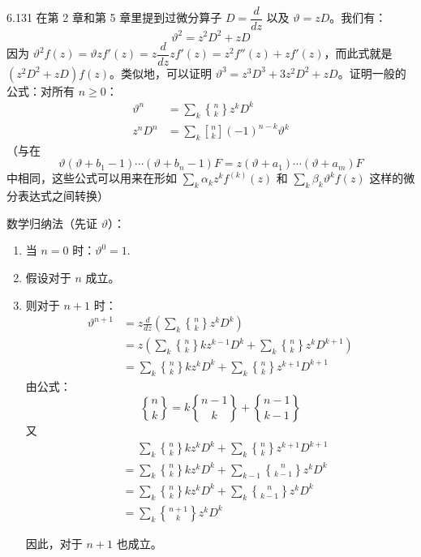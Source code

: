 \begin{problem}{6.13}{1}
  在第 2 章和第 5 章里提到过微分算子 \( D=\dfrac{d}{dz} \) 以及 \( \vartheta = zD \)。我们有：
  \[
    \vartheta^2 = z^2 D^2 + zD
  \]
  因为 \( \vartheta^2 f(z) = \vartheta z f'(z) = z \dfrac{d}{dz} zf'(z) = z^2 f''(z) + z f'(z) \)，而此式就是 \( (z^2 D^2 + zD) f(z) \)。类似地，可以证明 \( \vartheta^3 = z^3 D^3 + 3 z^2 D^2 + zD \)。证明一般的公式：对所有 \( n \ge 0 \)：
  \begin{align*}
    \vartheta^n &= \sum_k \genfrac{\{}{\}}{0pt}{} {n}{k} z^k D^k \\
    z^n D^n &= \sum_k \genfrac{[}{]}{0pt}{} {n}{k} (-1)^{n-k} \vartheta^k
  \end{align*}
  （与在
  \[
    \vartheta (\vartheta + b_1 - 1) \cdots (\vartheta + b_n - 1) F = z (\vartheta + a_1) \cdots (\vartheta + a_m) F
  \]
  中相同，这些公式可以用来在形如 \( \sum_k \alpha_k z^k f^{(k)} (z) \) 和 \( \sum_k \beta_k \vartheta^k f(z) \) 这样的微分表达式之间转换）
\end{problem}

数学归纳法（先证 \( \vartheta \)）：
\begin{enumerate}
  \item[1.] 当 \( n=0 \) 时：\( \vartheta^0 = 1 \).
  \item[2.] 假设对于 \( n \) 成立。
  \item[3.] 则对于 \( n+1 \) 时：
    \begin{align*}
      \vartheta^{n+1} &= z \frac{d}{dz} \left( \sum_k \genfrac{\{}{\}}{0pt}{} {n}{k} z^k D^k \right) \\
      &= z \left(\sum_k \genfrac{\{}{\}}{0pt}{} {n}{k} k z^{k-1} D^k + \sum_k \genfrac{\{}{\}}{0pt}{} {n}{k} z^k D^{k+1} \right) \\
      &= \sum_k \genfrac{\{}{\}}{0pt}{} {n}{k} k z^{k} D^k + \sum_k \genfrac{\{}{\}}{0pt}{} {n}{k} z^{k+1} D^{k+1}
    \end{align*}
    由公式：
    \[
      \boxed{\genfrac{\{}{\}}{0pt}{} {n}{k} = k \genfrac{\{}{\}}{0pt}{} {n-1}{k} + \genfrac{\{}{\}}{0pt}{} {n-1}{k-1}}
    \]
    又
    \begin{align*}
      &\phantom{=} \sum_k \genfrac{\{}{\}}{0pt}{} {n}{k} k z^{k} D^k + \sum_k \genfrac{\{}{\}}{0pt}{} {n}{k} z^{k+1} D^{k+1} \\
      &= \sum_k \genfrac{\{}{\}}{0pt}{} {n}{k} k z^{k} D^k + \sum_{k-1} \genfrac{\{}{\}}{0pt}{} {n}{k-1} z^{k} D^{k} \\
      &= \sum_k \genfrac{\{}{\}}{0pt}{} {n}{k} k z^{k} D^k + \sum_{k} \genfrac{\{}{\}}{0pt}{} {n}{k-1} z^{k} D^{k} \\
      &= \sum_k \genfrac{\{}{\}}{0pt}{} {n+1}{k} z^k D^k
    \end{align*}

    因此，对于 \( n+1 \) 也成立。
\end{enumerate}

